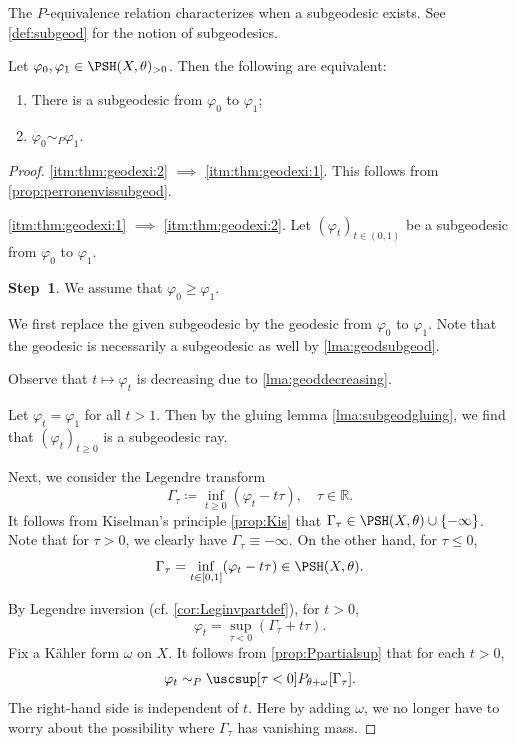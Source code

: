 The $P$-equivalence relation characterizes when a subgeodesic exists. See \cref{def:subgeod} for the notion of subgeodesics.
\begin{theorem}\label{thm:geodexi}
    Let $\varphi_0,\varphi_1\in \PSH(X,\theta)_{>0}$. Then the following are equivalent:
    \begin{enumerate}
        \item\label{itm:thm:geodexi:1} There is a subgeodesic from $\varphi_0$ to $\varphi_1$;
        \item\label{itm:thm:geodexi:2} $\varphi_0\sim_P\varphi_1$.
    \end{enumerate}
\end{theorem}
\begin{proof}
    \ref{itm:thm:geodexi:2} $\implies$ \ref{itm:thm:geodexi:1}. This follows from \cref{prop:perronenvissubgeod}.

    \ref{itm:thm:geodexi:1} $\implies$ \ref{itm:thm:geodexi:2}.
    Let $(\varphi_t)_{t\in (0,1)}$ be a subgeodesic from $\varphi_0$ to $\varphi_1$.

    \textbf{Step~1}. We assume that $\varphi_0\geq \varphi_1$.

    We first replace the given subgeodesic by the geodesic from $\varphi_0$ to $\varphi_1$. Note that the geodesic is necessarily a subgeodesic as well by \cref{lma:geodsubgeod}.

    Observe that $t\mapsto\varphi_t$ is decreasing due to \cref{lma:geoddecreasing}.

    Let $\varphi_t=\varphi_1$ for all $t>1$. Then by the gluing lemma \cref{lma:subgeodgluing}, we find that $(\varphi_t)_{t\geq 0}$ is a subgeodesic ray.

    Next, we consider the Legendre transform
    \[
    \Gamma_{\tau}\coloneqq \inf_{t\geq 0}(\varphi_t-t\tau),\quad \tau\in \mathbb{R}.
    \]
    It follows from Kiselman's principle \cref{prop:Kis} that $\Gamma_{\tau}\in \PSH(X,\theta)\cup \{-\infty\}$. Note that for $\tau>0$, we clearly have $\Gamma_{\tau}\equiv -\infty$. On the other hand, for $\tau\leq 0$,
    \[
    \Gamma_{\tau}=\inf_{t\in [0,1]}(\varphi_t-t\tau)\in \PSH(X,\theta).
    \]

    By Legendre inversion (cf. \cref{cor:Leginvpartdef}), for $t>0$,
    \[
    \varphi_t=\sup_{\tau<0} \left(\Gamma_{\tau}+t\tau\right).
    \]
    Fix a K\"ahler form $\omega$ on $X$.
    It follows from \cref{prop:Ppartialsup} that for each $t>0$,
    \[
    \varphi_t\sim_P \uscsup[\tau<0] P_{\theta+\omega}[\Gamma_{\tau}].
    \]
    The right-hand side is independent of $t$.
    Here by adding $\omega$, we no longer have to worry about the possibility where $\Gamma_{\tau}$ has vanishing mass.


\end{proof}
